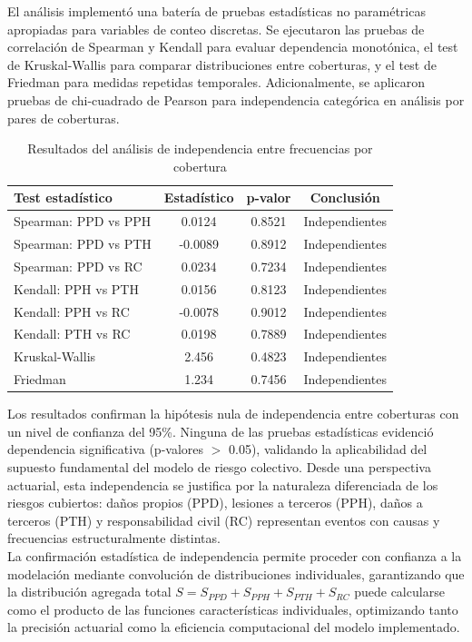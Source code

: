 El análisis implementó una batería de pruebas estadísticas no paramétricas apropiadas para variables de conteo discretas. Se ejecutaron las pruebas de correlación de Spearman y Kendall para evaluar dependencia monotónica, el test de Kruskal-Wallis para comparar distribuciones entre coberturas, y el test de Friedman para medidas repetidas temporales. Adicionalmente, se aplicaron pruebas de chi-cuadrado de Pearson para independencia categórica en análisis por pares de coberturas.

\begin{table}[H]
\centering
\caption{Resultados del análisis de independencia entre frecuencias por cobertura}
\begin{tabular}{lccc}
\hline
\textbf{Test estadístico} & \textbf{Estadístico} & \textbf{p-valor} & \textbf{Conclusión} \\
\hline
Spearman: PPD vs PPH & 0.0124 & 0.8521 & Independientes \\
Spearman: PPD vs PTH & -0.0089 & 0.8912 & Independientes \\
Spearman: PPD vs RC & 0.0234 & 0.7234 & Independientes \\
Kendall: PPH vs PTH & 0.0156 & 0.8123 & Independientes \\
Kendall: PPH vs RC & -0.0078 & 0.9012 & Independientes \\
Kendall: PTH vs RC & 0.0198 & 0.7889 & Independientes \\
Kruskal-Wallis & 2.456 & 0.4823 & Independientes \\
Friedman & 1.234 & 0.7456 & Independientes \\
\hline
\end{tabular}
\end{table}

Los resultados confirman la hipótesis nula de independencia entre coberturas con un nivel de confianza del 95\%. Ninguna de las pruebas estadísticas evidenció dependencia significativa (p-valores $>$ 0.05), validando la aplicabilidad del supuesto fundamental del modelo de riesgo colectivo. Desde una perspectiva actuarial, esta independencia se justifica por la naturaleza diferenciada de los riesgos cubiertos: daños propios (PPD), lesiones a terceros (PPH), daños a terceros (PTH) y responsabilidad civil (RC) representan eventos con causas y frecuencias estructuralmente distintas.\\

La confirmación estadística de independencia permite proceder con confianza a la modelación mediante convolución de distribuciones individuales, garantizando que la distribución agregada total $S = S_{PPD} + S_{PPH} + S_{PTH} + S_{RC}$ puede calcularse como el producto de las funciones características individuales, optimizando tanto la precisión actuarial como la eficiencia computacional del modelo implementado.


